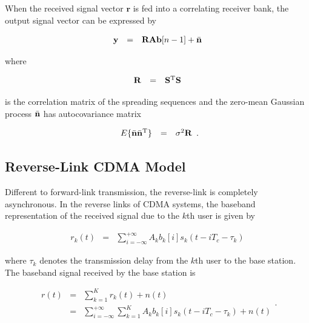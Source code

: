 \documentclass[a4paper,11pt,fleqn]{article}
\newcommand{\br}{{\mathbf r}}
\newcommand{\bA}{{\mathbf A}}
\newcommand{\bb}{{\bf b}}
\newcommand{\bn}{{\bf n}}
\newcommand{\by}{{\bf y}}
\newcommand{\bS}{{\bf S}}
\newcommand{\bR}{{\bf R}}
\begin{document}
When the received signal vector $\br$ is fed into a correlating
receiver bank, the output signal vector can be expressed by

\begin{equation}
\begin{array}{rcl}
\by&=&\bR\bA\bb[n-1]+\bar{\bn}
\end{array}
\end{equation}

\noindent where

\begin{equation}
\begin{array}{rcl}
\bR&=&\bS^{\rm T}\bS
\end{array}
\end{equation}

\noindent is the correlation matrix of the spreading sequences and
the zero-mean Gaussian process $\bar{\bn}$ has autocovariance
matrix

\begin{equation}
\begin{array}{rcl}
E\{\bar{\bn}\bar{\bn}^{\rm T}\}&=&\sigma^2\bR
\end{array}.
\end{equation}

\subsection{Reverse-Link CDMA Model}
Different to forward-link transmission, the reverse-link is
completely asynchronous. In the reverse links of CDMA systems, the
baseband representation of the received signal due to the $k$th
user is given by

\begin{equation}
\begin{array}{rcl}
r_k(t)&=&\sum\limits_{i=-\infty}^{+\infty}A_k b_k[i]
s_k(t-iT_c-\tau_k)
\end{array}
\end{equation}

\noindent where $\tau_k$ denotes the transmission delay from the
$k$th user to the base station. The baseband signal received by
the base station is

\begin{equation}
\begin{array}{rcl}
r(t)&=&\sum\limits_{k=1}^{K}r_k(t)+n(t)\\
&=&\sum\limits_{i=-\infty}^{+\infty}\sum\limits_{k=1}^{K}A_k
b_k[i] s_k(t-iT_c-\tau_k)+n(t)
\end{array}.
\end{equation}
\end{document}
